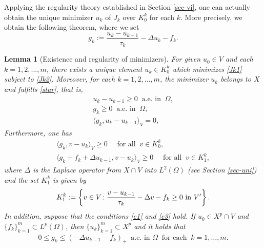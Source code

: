\documentclass[reqno,10pt]{amsart}
\newtheorem{Lem}[Th]{Lemma}
\begin{document}
Applying the regularity theory established in Section \ref{sec-vi}, one
can actually obtain the unique minimizer $u_k$ of $J_k$ over $K_0^k$ for each
$k$. More precisely, we obtain the following theorem, where we set
$$
g_k:=\frac{u_k-u_{k-1}}{\tau_k}-\Delta u_k-f_k.
$$
\begin{Lem}[Existence and regularity of minimizers]\label{th-uk}
For given $u_0\in V$ and each $k = 1,2,\ldots, m$, there exists a unique
 element $u_k \in K_0^k$ which minimizes \eqref{Jk1} subject to \eqref{Jk2}.
Moreover, for each $k = 1,2,\ldots, m$, the minimizer $u_k$ belongs to
 $X$ and fulfills \eqref{star}, that is,
\begin{align}
&u_k - u_{k-1} \geq 0 \ \mbox{ a.e.~in } \ \Omega,\label{n40}\\
&g_k \geq 0 \ \mbox{ a.e.~in } \ \Omega,
&\label{c-K1}\\
&\langle g_k, u_k-u_{k-1} \rangle_V =0,
&\label{c-c}
\end{align}
Furthermore, one has
\begin{align}
&\langle g_k, v-u_k \rangle_V \ge 0
\quad \mbox{ for all }\ v\in K_0^k,
&\label{c-b}\\
&\langle g_k+f_k+\Delta u_{k-1}, v-u_k \rangle_V \ge 0
\quad
\mbox{ for all } \ v\in K_1^k,
&\label{c-d}
\end{align}
where $\Delta$ is the Laplace operator from $X \cap V$ into
 $L^2(\Omega)$ {\rm (}see Section \ref{sec-uni}{\rm )} and the set
 $K^k_1$ is given by
\begin{align*}
 K_1^k:=\left\{v\in V \colon \frac{v-u_{k-1}}{\tau_k}-\Delta v-f_k\ge
  0 \ \mbox{\rm in } V' \right\}.
\end{align*}
In addition, suppose that the conditions \eqref{c1} and \eqref{c3} hold. If $u_0\in X^p \cap V$
 and $\{f_k\}_{k=1}^m\subset L^p(\Omega)$, 
then $\{u_k\}_{k=1}^m\subset X^p$ and it holds that
\begin{align}\label{c-K2}
0\le g_k
\le \left(-\Delta u_{k-1}-f_k \right)_+
\ \mbox{ a.e.~in } \Omega
\ \mbox{ for each } \ k=1,\ldots,m.
\end{align}
\end{Lem}
\end{document}
